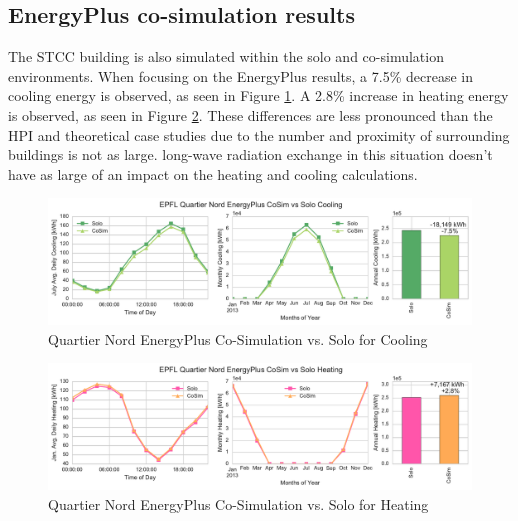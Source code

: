 \documentclass{tBPS2e}
\theoremstyle{plain}
\theoremstyle{definition}
\theoremstyle{remark}
\begin{document}
\subsection{EnergyPlus co-simulation results}
The STCC building is also simulated within the solo and
co-simulation environments. When
focusing on the EnergyPlus results, a 7.5\% decrease in cooling energy is
observed, as seen in Figure
\ref{fig:qn_eplus_cosimvssolo_cooling}. A 2.8\% increase in heating energy is
observed, as seen in Figure
\ref{fig:qn_eplus_cosimvssolo_heating}. These differences are less pronounced
than the HPI and theoretical case studies due to the number and proximity of
surrounding buildings is not as large. long-wave radiation exchange in this situation doesn't have as large of an impact on the heating and cooling calculations.


\begin{figure}[H]
\centering
\includegraphics[scale=0.55]{figures/QN_EnergyPlus_Cooling}
\caption{Quartier Nord EnergyPlus Co-Simulation vs. Solo for Cooling}
\label{fig:qn_eplus_cosimvssolo_cooling}
\end{figure}


\begin{figure}[H]
\centering
\includegraphics[scale=0.55]{figures/QN_EnergyPlus_Heating}
\caption{Quartier Nord EnergyPlus Co-Simulation vs. Solo for Heating}
\label{fig:qn_eplus_cosimvssolo_heating}
\end{figure}

\end{document}
